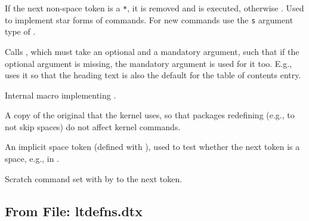 \documentclass{l3in2edoc}
\begin{document}
\begin{function}[]
  {
    \@ifstar
  }
  \begin{syntax}
      
  \end{syntax}
  If the next non-space token is a \texttt{*}, it is removed and
   is executed, otherwise . Used to implement
  star forms of commands. For new commands use the \texttt{s}
  argument type of .
\end{function}



\begin{function}[]
  {
    \@dblarg
  }
  \begin{syntax}
     
  \end{syntax}
  Calls , which must take an optional and a mandatory
  argument, such that if the optional argument is missing, the
  mandatory argument is used for it too. E.g.,  uses it
  so that the heading text is also the default for the table of
  contents entry.
\end{function}



\begin{function}[int]
  {
    \@xdblarg
  }
  Internal macro implementing .
\end{function}



\begin{function}[int]
  {
  }
  A copy of the original  that the kernel uses, so that
  packages redefining  (e.g., to not skip spaces) do
  not affect kernel commands.
\end{function}


\begin{function}[int]
  {
    \@sptoken
  }
  An implicit space token (defined with ), used to test whether
  the next token is a space, e.g., in .
\end{function}


\begin{function}[int]
  {
    \@let@token
  }
  Scratch command set with  by  to the
  next token.
\end{function}





\subsection{From File: ltdefns.dtx}
\end{document}
